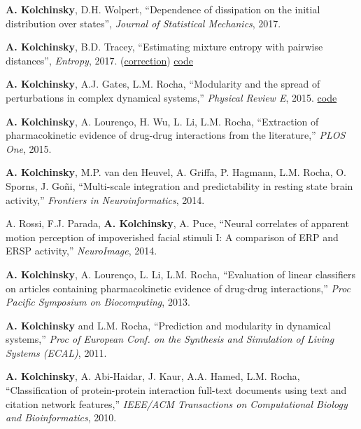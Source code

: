 \textbf{A. Kolchinsky}, D.H. Wolpert, ``Dependence of dissipation on the initial distribution over states'',
\emph{Journal of Statistical Mechanics}, 2017. 

\textbf{A. Kolchinsky}, B.D. Tracey, ``Estimating mixture entropy with pairwise distances'', \emph{Entropy}, 2017.
(\href{https://www.mdpi.com/1099-4300/19/11/588}{correction}) 
\href{https://github.com/btracey/mixent/}{code}


\textbf{A. Kolchinsky}, A.J. Gates, L.M. Rocha, ``Modularity and
the spread of perturbations in complex dynamical systems,'' \emph{Physical Review E}, 2015. 
\href{https://github.com/artemyk/perturbationmodularity/}{code}

\textbf{A. Kolchinsky}, A. Lourenço, H. Wu, L. Li, L.M. Rocha,
``Extraction of pharmacokinetic evidence of drug-drug interactions
from the literature,'' \emph{PLOS One}, 2015. 

\textbf{A. Kolchinsky}, M.P. van den Heuvel, A. Griffa, P. Hagmann, L.M. Rocha, O. Sporns, J. Goñi, ``Multi-scale
integration and predictability in resting state brain activity,'' 
\emph{Frontiers in Neuroinformatics}, 2014. 

A. Rossi, F.J. Parada, \textbf{A. Kolchinsky}, A. Puce, ``Neural correlates of apparent motion perception of impoverished facial stimuli I: A comparison of ERP and ERSP activity,'' \emph{NeuroImage}, 2014. 

\textbf{A. Kolchinsky}, A. Lourenço, L. Li, L.M. Rocha, ``Evaluation of linear classifiers on articles containing pharmacokinetic evidence of drug-drug interactions,'' \emph{Proc Pacific Symposium on Biocomputing}, 2013. 

\textbf{A. Kolchinsky} and L.M. Rocha, ``Prediction and modularity in dynamical systems,'' \emph{Proc
of European Conf. on the Synthesis and Simulation of Living Systems (ECAL)}, 2011. 

\textbf{A. Kolchinsky}, A. Abi-Haidar, J. Kaur, A.A. Hamed, L.M. Rocha, ``Classification of protein-protein interaction full-text documents using text and citation network features,'' \emph{IEEE/ACM Transactions on Computational Biology and Bioinformatics}, 2010. 

